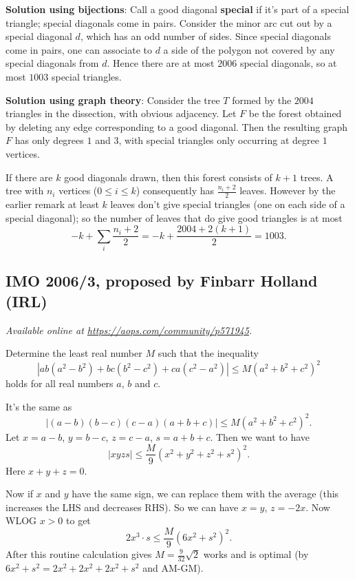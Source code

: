 \documentclass[11pt]{scrartcl}
\begin{document}
\textbf{Solution using bijections}:
Call a good diagonal \textbf{special} if it's part of a special triangle;
special diagonals come in pairs.
Consider the minor arc cut out by a special diagonal $d$,
which has an odd number of sides.
Since special diagonals come in pairs,
one can associate to $d$ a side of the polygon
not covered by any special diagonals from $d$.
Hence there are at most $2006$ special diagonals,
so at most $1003$ special triangles.

\textbf{Solution using graph theory}:
Consider the tree $T$ formed by the $2004$
triangles in the dissection, with obvious adjacency.
Let $F$ be the forest obtained by deleting
any edge corresponding to a good diagonal.
Then the resulting graph $F$ has only degrees $1$ and $3$,
with special triangles only occurring at degree $1$ vertices.

If there are $k$ good diagonals drawn,
then this forest consists of $k+1$ trees.
A tree with $n_i$ vertices ($0 \le i \le k$)
consequently has $\frac{n_i+2}{2}$ leaves.
However by the earlier remark at least $k$ leaves
don't give special triangles
(one on each side of a special diagonal);
so the number of leaves that do give good triangles is at most
\[ -k + \sum_i \frac{n_i+2}{2}
  = -k + \frac{2004 + 2(k+1)}{2} = 1003. \]
\pagebreak

\subsection{IMO 2006/3, proposed by Finbarr Holland (IRL)}
\textsl{Available online at \url{https://aops.com/community/p571945}.}
\begin{mdframed}[style=mdpurplebox,frametitle={Problem statement}]
Determine the least real number $M$ such that the inequality
\[ \left\lvert ab(a^2-b^2)+bc(b^2-c^2)+ca(c^2-a^2) \right\rvert
  \leq M\left( a^2+b^2+c^2 \right)^2 \]
holds for all real numbers $a$, $b$ and $c$.
\end{mdframed}
It's the same as
\[ \left\lvert (a-b)(b-c)(c-a)(a+b+c) \right\rvert
\le M \left( a^2+b^2+c^2 \right)^2. \]
Let $x=a-b$, $y=b-c$, $z=c-a$, $s=a+b+c$.
Then we want to have
\[
  \left\lvert xyzs \right\rvert
  \le \frac{M}{9} (x^2+y^2+z^2+s^2)^2.
\]
Here $x+y+z=0$.

Now if $x$ and $y$ have the same sign,
we can replace them with the average
(this increases the LHS and decreases RHS).
So we can have $x=y$, $z=-2x$.
Now WLOG $x > 0$ to get
\[ 2x^3 \cdot s \le \frac{M}{9} \left( 6x^2+s^2 \right)^2. \]
After this routine calculation gives
$M = \frac{9}{32}\sqrt2$ works and is optimal
(by $6x^2+s^2 = 2x^2 + 2x^2 + 2x^2 + s^2$ and AM-GM).
\pagebreak
\end{document}
